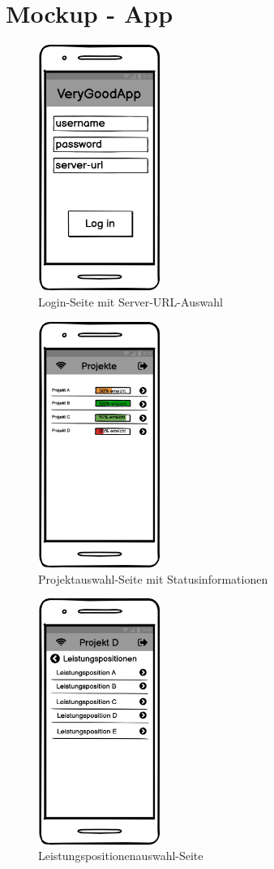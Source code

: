 \section{Mockup - App}

\begin{figure}[ht]
	\centering
	\includegraphics[width=4cm, height=8cm]{img/mockup-app/Login-screen.png}
	\caption{Login-Seite mit Server-URL-Auswahl}
\end{figure}

\begin{figure}[ht]
	\centering
	\includegraphics[width=4cm, height=8cm]{img/mockup-app/Projekte_Auswahl.png}
	\caption{Projektauswahl-Seite mit Statusinformationen}
\end{figure}

\begin{figure}[ht]
	\centering
	\includegraphics[width=4cm, height=8cm]{img/mockup-app/Leistungspositionen_Auswahl.png}
	\caption{Leistungspositionenauswahl-Seite}
\end{figure}

